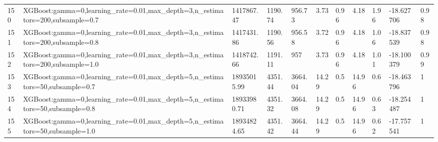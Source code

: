 \begin{longtable}{C{0.8cm} L{2cm} C{1.15cm} C{1.15cm} C{1.15cm} C{1.15cm} C{0.85cm} C{1.25cm} C{1.2cm} C{1.5cm} C{1.0cm}}
150 & XGBoost:\newline gamma=0,\newline learning\_rate=0.01,\newline max\_depth=3,\newline n\_estimators=200,\newline subsample=0.7 & 1417867.47 & 1190.74 & 956.73 & 3.73 & 0.96 & 4.18 & 1.96 & -18.627706 & 0.98 \\
151 & XGBoost:\newline gamma=0,\newline learning\_rate=0.01,\newline max\_depth=3,\newline n\_estimators=200,\newline subsample=0.8 & 1417431.86 & 1190.56 & 956.58 & 3.72 & 0.96 & 4.18 & 1.06 & -18.837539 & 0.98 \\
152 & XGBoost:\newline gamma=0,\newline learning\_rate=0.01,\newline max\_depth=3,\newline n\_estimators=200,\newline subsample=1.0 & 1418742.66 & 1191.11 & 957 & 3.73 & 0.96 & 4.18 & 1.01 & -18.100379 & 0.99 \\
153 & XGBoost:\newline gamma=0,\newline learning\_rate=0.01,\newline max\_depth=5,\newline n\_estimators=50,\newline subsample=0.7 & 18935015.99 & 4351.44 & 3664.04 & 14.29 & 0.5 & 14.96 & 0.6 & -18.463796 & 1 \\
154 & XGBoost:\newline gamma=0,\newline learning\_rate=0.01,\newline max\_depth=5,\newline n\_estimators=50,\newline subsample=0.8 & 18933980.71 & 4351.32 & 3664.08 & 14.29 & 0.5 & 14.96 & 0.63 & -18.254487 & 1 \\
155 & XGBoost:\newline gamma=0,\newline learning\_rate=0.01,\newline max\_depth=5,\newline n\_estimators=50,\newline subsample=1.0 & 18934824.65 & 4351.42 & 3664.44 & 14.29 & 0.5 & 14.96 & 0.62 & -17.757541 & 1 \\

\end{longtable}
